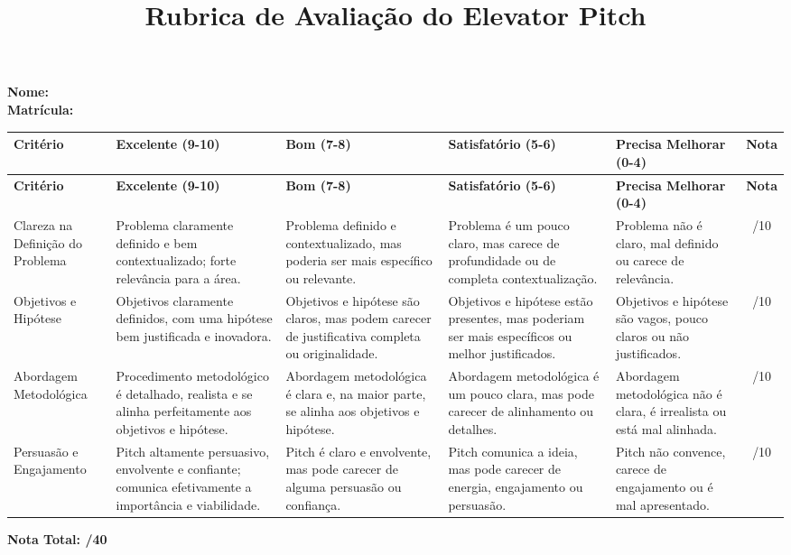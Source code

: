 \documentclass{article}
\begin{document}
\title{Rubrica de Avaliação do Elevator Pitch}
\author{}
\date{}
\maketitle

\textbf{Nome:} \\

\textbf{Matrícula:}

\vspace{1em}

\begin{longtable}{|p{2cm}|p{2.5cm}|p{2.5cm}|p{2.5cm}|p{2.5cm}|c|}
\hline
\textbf{Critério} & \textbf{Excelente (9-10)} & \textbf{Bom (7-8)} & \textbf{Satisfatório (5-6)} & \textbf{Precisa Melhorar (0-4)} & \textbf{Nota} \\
\hline
\endfirsthead
\hline
\textbf{Critério} & \textbf{Excelente (9-10)} & \textbf{Bom (7-8)} & \textbf{Satisfatório (5-6)} & \textbf{Precisa Melhorar (0-4)} & \textbf{Nota} \\
\hline
\endhead
\hline
\endfoot
\hline
\endlastfoot
Clareza na Definição do Problema & Problema claramente definido e bem contextualizado; forte relevância para a área. & Problema definido e contextualizado, mas poderia ser mais específico ou relevante. & Problema é um pouco claro, mas carece de profundidade ou de completa contextualização. & Problema não é claro, mal definido ou carece de relevância. & /10 \\
\hline
Objetivos e Hipótese & Objetivos claramente definidos, com uma hipótese bem justificada e inovadora. & Objetivos e hipótese são claros, mas podem carecer de justificativa completa ou originalidade. & Objetivos e hipótese estão presentes, mas poderiam ser mais específicos ou melhor justificados. & Objetivos e hipótese são vagos, pouco claros ou não justificados. & /10 \\
\hline
Abordagem Metodológica & Procedimento metodológico é detalhado, realista e se alinha perfeitamente aos objetivos e hipótese. & Abordagem metodológica é clara e, na maior parte, se alinha aos objetivos e hipótese. & Abordagem metodológica é um pouco clara, mas pode carecer de alinhamento ou detalhes. & Abordagem metodológica não é clara, é irrealista ou está mal alinhada. & /10 \\
\hline
Persuasão e Engajamento & Pitch altamente persuasivo, envolvente e confiante; comunica efetivamente a importância e viabilidade. & Pitch é claro e envolvente, mas pode carecer de alguma persuasão ou confiança. & Pitch comunica a ideia, mas pode carecer de energia, engajamento ou persuasão. & Pitch não convence, carece de engajamento ou é mal apresentado. & /10 \\


\end{longtable}

\vspace{1em}

\textbf{Nota Total: /40}
\end{document}
